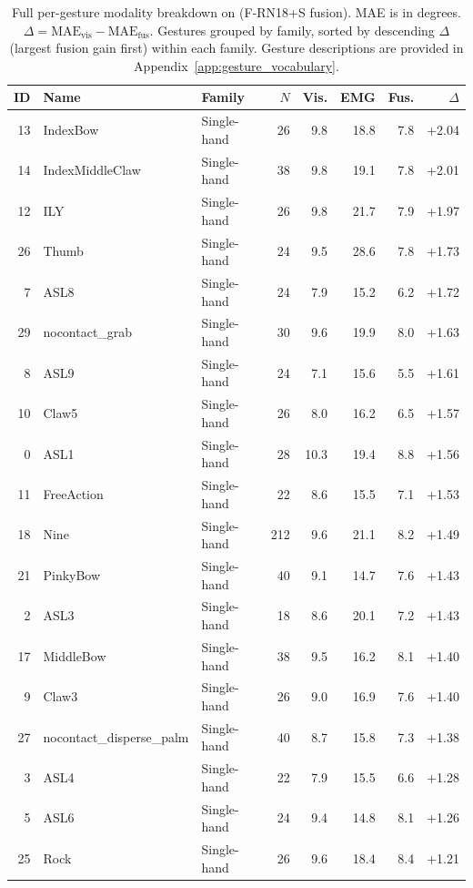 \begin{table}[h]
\centering
\caption{Full per-gesture modality breakdown on \dataset{} (F-RN18+S fusion). MAE is in degrees. $\Delta = \text{MAE}_\text{vis} - \text{MAE}_\text{fus}$. Gestures grouped by family, sorted by descending $\Delta$ (largest fusion gain first) within each family. Gesture descriptions are provided in Appendix~\ref{app:gesture_vocabulary}.}
\label{tab:per_gesture_full}
\scriptsize
\setlength{\tabcolsep}{2.2pt}
\renewcommand{\arraystretch}{1.02}
\begin{tabular}{rllrrrrr}
\toprule
ID & Name & Family & $N$ & Vis. & EMG & Fus. & $\Delta$ \\
\midrule
13 & IndexBow & Single-hand & 26 & 9.8 & 18.8 & 7.8 & +2.04 \\
14 & IndexMiddleClaw & Single-hand & 38 & 9.8 & 19.1 & 7.8 & +2.01 \\
12 & ILY & Single-hand & 26 & 9.8 & 21.7 & 7.9 & +1.97 \\
26 & Thumb & Single-hand & 24 & 9.5 & 28.6 & 7.8 & +1.73 \\
7 & ASL8 & Single-hand & 24 & 7.9 & 15.2 & 6.2 & +1.72 \\
29 & nocontact\_grab & Single-hand & 30 & 9.6 & 19.9 & 8.0 & +1.63 \\
8 & ASL9 & Single-hand & 24 & 7.1 & 15.6 & 5.5 & +1.61 \\
10 & Claw5 & Single-hand & 26 & 8.0 & 16.2 & 6.5 & +1.57 \\
0 & ASL1 & Single-hand & 28 & 10.3 & 19.4 & 8.8 & +1.56 \\
11 & FreeAction & Single-hand & 22 & 8.6 & 15.5 & 7.1 & +1.53 \\
18 & Nine & Single-hand & 212 & 9.6 & 21.1 & 8.2 & +1.49 \\
21 & PinkyBow & Single-hand & 40 & 9.1 & 14.7 & 7.6 & +1.43 \\
2 & ASL3 & Single-hand & 18 & 8.6 & 20.1 & 7.2 & +1.43 \\
17 & MiddleBow & Single-hand & 38 & 9.5 & 16.2 & 8.1 & +1.40 \\
9 & Claw3 & Single-hand & 26 & 9.0 & 16.9 & 7.6 & +1.40 \\
27 & nocontact\_disperse\_palm & Single-hand & 40 & 8.7 & 15.8 & 7.3 & +1.38 \\
3 & ASL4 & Single-hand & 22 & 7.9 & 15.5 & 6.6 & +1.28 \\
5 & ASL6 & Single-hand & 24 & 9.4 & 14.8 & 8.1 & +1.26 \\
25 & Rock & Single-hand & 26 & 9.6 & 18.4 & 8.4 & +1.21 \\

\end{tabular}
\end{table}
